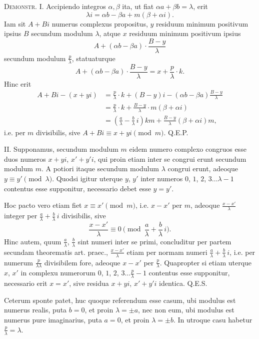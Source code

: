 \documentclass[12pt]{article}
\begin{document}
\medskip
\noindent\textsc{Demonstr.} I. Accipiendo integros $\alpha,\beta$ ita, ut fiat $\alpha a+\beta b=\lambda$, erit
\[
\lambda i=\alpha b-\beta a+m(\beta+\alpha i).
\]
Iam sit $A+Bi$ numerus complexus propositus, $y$ residuum minimum positivum ipsius $B$ secundum modulum $\lambda$, atque $x$ residuum minimum positivum ipsius
\[
A+(\alpha b-\beta a)\cdot\frac{B-y}{\lambda}
\]
secundum modulum $\frac{p}{\lambda}$, statuaturque
\[
A+(\alpha b-\beta a)\cdot\frac{B-y}{\lambda}=x+\frac{p}{\lambda}\cdot k.
\]
Hinc erit
\[
\begin{aligned}
A+Bi-(x+yi)
&=\frac{p}{\lambda}\cdot k+(B-y)i-(\alpha b-\beta a)\frac{B-y}{\lambda}\\
&=\frac{p}{\lambda}\cdot k+\frac{B-y}{\lambda}\cdot m(\beta+\alpha i)\\
&=\left(\frac{a}{\lambda}-\frac{b}{\lambda}\,i\right)km+\frac{B-y}{\lambda}(\beta+\alpha i)m,
\end{aligned}
\]
i.e. per $m$ divisibilis, sive $A+Bi\equiv x+yi \pmod{m}$. Q.E.P.

II. Supponamus, secundum modulum $m$ eidem numero complexo congruos esse duos numeros $x+yi$, $x'+y'i$, qui proin etiam inter se congrui erunt secundum modulum $m$. A potiori itaque secundum modulum $\lambda$ congrui erunt, adeoque $y\equiv y' \pmod{\lambda}$. Quodsi igitur uterque $y$, $y'$ inter numeros $0$, $1$, $2$, $3\ldots \lambda-1$ contentus esse supponitur, necessario debet esse $y=y'$.

Hoc pacto vero etiam fiet $x\equiv x' \pmod{m}$, i.e. $x-x'$ per $m$, adeoque $\frac{x-x'}{\lambda}$ integer per $\frac{a}{\lambda}+\frac{b}{\lambda}\,i$ divisibilis, sive
\[
\frac{x-x'}{\lambda}\equiv 0\pmod{\frac{a}{\lambda}+\frac{b}{\lambda}\,i}.
\]
Hinc autem, quum $\frac{a}{\lambda}$, $\frac{b}{\lambda}$ sint numeri inter se primi, concluditur per partem secundam theorematis art. praec., $\frac{x-x'}{\lambda}$ etiam per normam numeri $\frac{a}{\lambda}+\frac{b}{\lambda}\,i$, i.e. per numerum $\frac{p}{\lambda\lambda}$ divisibilem fore, adeoque $x-x'$ per $\frac{p}{\lambda}$. Quapropter si etiam uterque $x$, $x'$ in complexu numerorum $0$, $1$, $2$, $3\ldots \frac{p}{\lambda}-1$ contentus esse supponitur, necessario erit $x=x'$, sive residua $x+yi$, $x'+y'i$ identica. Q.E.S.

Ceterum sponte patet, huc quoque referendum esse casum, ubi modulus est numerus realis, puta $b=0$, et proin $\lambda=\pm a$, nec non eum, ubi modulus est numerus pure imaginarius, puta $a=0$, et proin $\lambda=\pm b$. In utroque casu habetur $\frac{p}{\lambda}=\lambda$.
\end{document}
